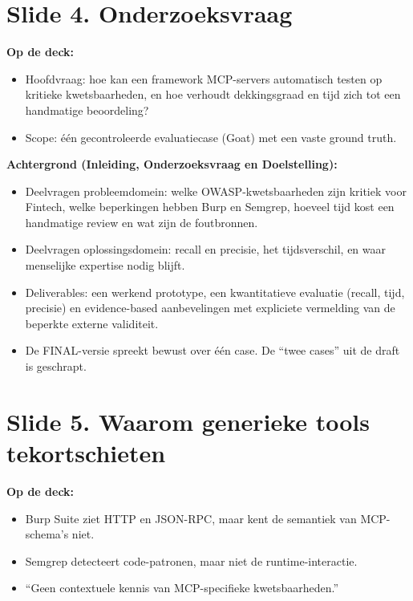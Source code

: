 \documentclass[11pt,a4paper]{article}
\begin{document}
\section{Slide 4. Onderzoeksvraag}
\textbf{Op de deck:}
\begin{itemize}
  \item Hoofdvraag: hoe kan een framework MCP-servers automatisch testen op kritieke kwetsbaarheden, en hoe verhoudt dekkingsgraad en tijd zich tot een handmatige beoordeling?
  \item Scope: \'e\'en gecontroleerde evaluatiecase (Goat) met een vaste ground truth.
\end{itemize}

\textbf{Achtergrond (Inleiding, Onderzoeksvraag en Doelstelling):}
\begin{itemize}
  \item Deelvragen probleemdomein: welke OWASP-kwetsbaarheden zijn kritiek voor Fintech, welke beperkingen hebben Burp en Semgrep, hoeveel tijd kost een handmatige review en wat zijn de foutbronnen.
  \item Deelvragen oplossingsdomein: recall en precisie, het tijdsverschil, en waar menselijke expertise nodig blijft.
  \item Deliverables: een werkend prototype, een kwantitatieve evaluatie (recall, tijd, precisie) en evidence-based aanbevelingen met expliciete vermelding van de beperkte externe validiteit.
  \item De FINAL-versie spreekt bewust over \'e\'en case. De ``twee cases'' uit de draft is geschrapt.
\end{itemize}

\section{Slide 5. Waarom generieke tools tekortschieten}
\textbf{Op de deck:}
\begin{itemize}
  \item Burp Suite ziet HTTP en JSON-RPC, maar kent de semantiek van MCP-schema's niet.
  \item Semgrep detecteert code-patronen, maar niet de runtime-interactie.
  \item ``Geen contextuele kennis van MCP-specifieke kwetsbaarheden.''
\end{itemize}
\end{document}
